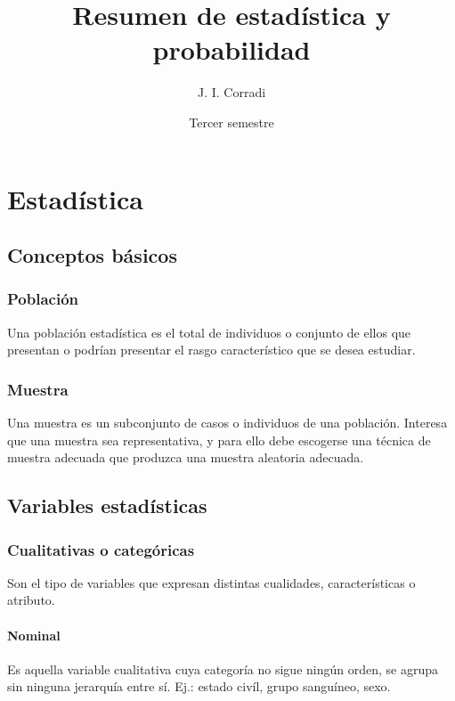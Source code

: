 \documentclass{report}
\title{Resumen de estadística y probabilidad}
\date{Tercer semestre}
\author{J. I. Corradi}
\begin{document}
  \maketitle
  \setcounter{tocdepth}{5}
  \tableofcontents
  \newpage

  \chapter*{Estadística}

    \section*{Conceptos básicos}

      \subsection*{Población}
        Una población estadística es el total de individuos o conjunto de ellos 
        que presentan o podrían presentar el rasgo característico que se desea 
        estudiar.

      \subsection*{Muestra}
      Una muestra es un subconjunto de casos o individuos de una población. 
      Interesa que una muestra sea representativa, y para ello debe escogerse 
      una técnica de muestra adecuada que produzca una muestra aleatoria adecuada.

    \section*{Variables estadísticas}

      \subsection*{Cualitativas o categóricas}
        Son el tipo de variables que expresan distintas cualidades, características 
        o atributo.

        \subsubsection*{Nominal}
          Es aquella variable cualitativa cuya categoría no sigue ningún orden, 
          se agrupa sin ninguna jerarquía entre sí. Ej.: estado civíl, grupo 
          sanguíneo, sexo.
\end{document}
